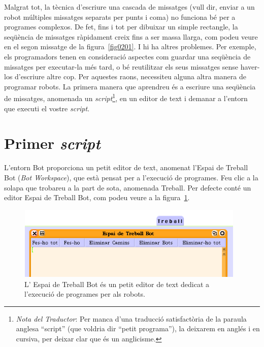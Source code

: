 Malgrat tot, la tècnica d'escriure una cascada de missatges (vull dir, enviar a un robot múltiples missatges separats per punts i coma) no funciona bé per a programes complexos. De fet, fins i tot per dibuixar un simple rectangle, la seqüència de missatges ràpidament creix fins a ser massa llarga, com podeu veure en el segon missatge de la figura~\ref{fig0201}. I hi ha altres problemes. Per exemple, els programadors tenen en consideració aspectes com guardar una seqüència de missatges per executar-la més tard, o bé reutilitzar els seus missatges sense haver-los d'escriure altre cop. 
Per aquestes raons, necessiteu alguna altra manera de programar robots. La primera manera que aprendreu és a escriure una seqüència de missatges, anomenada un \emph{script}\footnote{\emph{Nota del Traductor}: Per manca d'una traducció satisfactòria de la paraula anglesa ``script'' (que voldria dir ``petit programa''), la deixarem en anglés i en cursiva, per deixar clar que és un anglicisme.}, en un editor de text i demanar a l'entorn que executi el vostre \emph{script}.

\section{Primer \emph{script}}
L'entorn \textsf{Bot} proporciona un petit editor de text, anomenat l'\textsf{Espai de Treball Bot} (\emph{Bot Workspace}), que està pensat per a l'execució de programes. Feu clic a la solapa que trobareu a la part de sota, anomenada \textsf{Treball}. Per defecte conté un editor \textsf{Espai de Treball Bot}, com podeu veure a la figura~\ref{fig0202}.

\begin{figure}[h]
\begin{center}
\includegraphics[height=35mm ,width=109mm ]{Imatges/figura2-2.png}
\end{center}
\caption{L' \textsf{\upshape Espai de Treball Bot} és un petit editor de text dedicat a l'execució de programes per als robots.}
\label{fig0202}
\end{figure}

